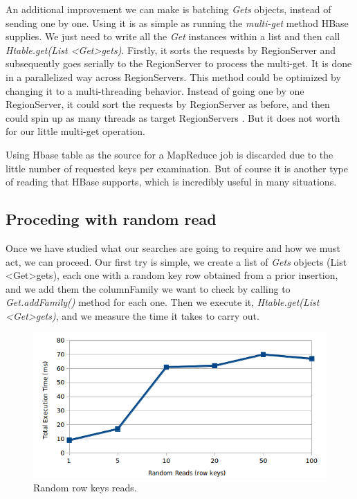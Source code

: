 An additional improvement we can make is batching \textit{Gets} objects, instead of sending one by one. Using it is as simple as running the \textit{multi-get} method HBase supplies. We just need to write all the \textit{Get} instances within a list and then call \textit{Htable.get(List \textless{Get}\textgreater gets)}. Firstly, it sorts the requests by RegionServer and subsequently goes serially to the RegionServer to process the multi-get. It is done in a parallelized way across RegionServers. 
This method could be optimized by changing it to a multi-threading behavior. Instead of going one by one RegionServer, it could sort the requests by RegionServer as before, and then could spin up as many threads as target RegionServers \cite{http://comments.gmane.org/gmane.comp.java.hadoop.hbase.user/34417}. But it does not worth for our little multi-get operation.

\bigskip

Using Hbase table as the source for a MapReduce job is discarded due to the little number of requested keys per examination. But of course it is another type of reading that HBase supports, which is incredibly useful in many situations. 
\par

\subsection{Proceding with random read}

Once we have studied what our searches are going to require and how we must act, we can proceed. Our first try is simple, we create a list of \textit{Gets} objects (List \textless{Get}\textgreater gets), each one with a random key row obtained from a prior insertion, and we add them the columnFamily we want to check by calling to \textit{Get.addFamily()} method for each one. Then we execute it, \textit{Htable.get(List \textless{Get}\textgreater gets)}, and we measure the time it takes to carry out.


\begin{figure}[htb]
\centering
\includegraphics[width=1\textwidth]{./images/randomReads2.png}
\caption{Random row keys reads.} \label{fig:randomReads}
\end{figure}




